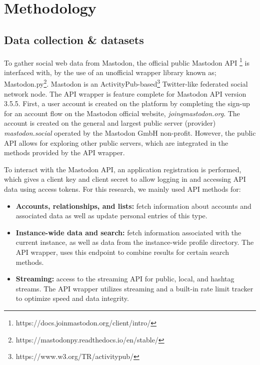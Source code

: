 \section{Methodology}
\subsection{Data collection \& datasets}
To gather social web data from Mastodon, the official public Mastodon API \footnote{https://docs.joinmastodon.org/client/intro/} is interfaced with, by the use of an unofficial wrapper library known as; Mastodon.py\footnote{https://mastodonpy.readthedocs.io/en/stable/}.
Mastodon is an ActivityPub-based\footnote{https://www.w3.org/TR/activitypub/} Twitter-like federated social network node.
The API wrapper is feature complete for Mastodon API version 3.5.5.
First, a user account is created on the platform by completing the sign-up for an account flow on the Mastodon official website, \textit{joingmastodon.org}.
The account is created on the general and largest public server (provider) \textit{mastodon.social} operated by the Mastodon GmbH non-profit.
However, the public API allows for exploring other public servers, which are integrated in the methods provided by the API wrapper.

To interact with the Mastodon API, an application registration is performed, which gives a client key and client secret to allow logging in and accessing API data using access tokens.
For this research, we mainly used API methods for:
\begin{itemize}
  \item \textbf{Accounts, relationships, and lists:} fetch information about accounts and associated data as well as update personal entries of this type.
  \item \textbf{Instance-wide data and search:} fetch information associated with the current instance, as well as data from the instance-wide profile directory. 
  The API wrapper, uses this endpoint to combine results for certain search methods.
  \item \textbf{Streaming:} access to the streaming API for public, local, and hashtag streams.
  The API wrapper utilizes streaming and a built-in rate limit tracker to optimize speed and data integrity.
\end{itemize}

